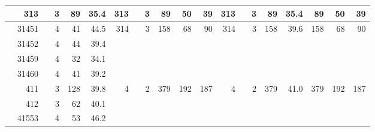 \begin{table}[ht!]
\begin{tabular}{rrrrrrrrrrrrrrrr}
313 & 3 & 89 & \multicolumn{1}{r|}{﻿35.4} & 313 & 3 & 89 & 50 & \multicolumn{1}{r|}{﻿39} & 313 & 3 & 89 & 35.4 & 89 & 50 & 39 \\
\bottomrule
\colorbox{medium-gray}{ 31451} & \colorbox{medium-gray}{\ \  4} & \colorbox{medium-gray}{ 41} & \multicolumn{1}{r|}{\colorbox{medium-gray}{ ﻿44.5}} & \colorbox{medium-gray}{ 314} & \colorbox{medium-gray}{\ \  3} & \colorbox{medium-gray}{ 158} & \colorbox{medium-gray}{ 68} & \multicolumn{1}{r|}{\colorbox{medium-gray}{ ﻿90}} & \colorbox{medium-gray}{ 314} & \colorbox{medium-gray}{\ \  3} & \colorbox{medium-gray}{ 158} & \colorbox{medium-gray}{ 39.6} & \colorbox{medium-gray}{ 158} & \colorbox{medium-gray}{ 68} & \colorbox{medium-gray}{ 90} \\ 
\colorbox{medium-gray}{ 31452} & \colorbox{medium-gray}{\ \  4} & \colorbox{medium-gray}{ 44} & \multicolumn{1}{r|}{\colorbox{medium-gray}{ ﻿39.4}} &  &  &  &  & \multicolumn{1}{r|}{﻿} &  &  &  &  &  &  &  \\ 
\colorbox{medium-gray}{ 31459} & \colorbox{medium-gray}{\ \  4} & \colorbox{medium-gray}{ 32} & \multicolumn{1}{r|}{\colorbox{medium-gray}{ ﻿34.1}} &  &  &  &  & \multicolumn{1}{r|}{﻿} &  &  &  &  &  &  &  \\ 
\colorbox{medium-gray}{ 31460} & \colorbox{medium-gray}{\ \  4} & \colorbox{medium-gray}{ 41} & \multicolumn{1}{r|}{\colorbox{medium-gray}{ ﻿39.2}} &  &  &  &  & \multicolumn{1}{r|}{﻿} &  &  &  &  &  &  &  \\
\bottomrule
\colorbox{light-gray}{\ \ \ \  411} & \colorbox{light-gray}{\ \  3} & \colorbox{light-gray}{128} & \multicolumn{1}{r|}{\colorbox{light-gray}{ ﻿39.8}} & \colorbox{light-gray}{\ \  4} & \colorbox{light-gray}{\ \  2} & \colorbox{light-gray}{ 379} & \colorbox{light-gray}{ 192} & \multicolumn{1}{r|}{\colorbox{light-gray}{ 187}} & \colorbox{light-gray}{\ \  4} & \colorbox{light-gray}{\ \  2} & \colorbox{light-gray}{ 379} & \colorbox{light-gray}{ 41.0} & \colorbox{light-gray}{ 379} & \colorbox{light-gray}{ 192} & \colorbox{light-gray}{ 187} \\ 
\colorbox{light-gray}{\ \ \ \  412} & \colorbox{light-gray}{\ \  3} & \colorbox{light-gray}{ 62} & \multicolumn{1}{r|}{\colorbox{light-gray}{ ﻿40.1}} &  &  &  &  & \multicolumn{1}{r|}{﻿} &  &  &  &  &  &  &  \\ 
\colorbox{light-gray}{ 41553} & \colorbox{light-gray}{\ \  4} & \colorbox{light-gray}{ 53} & \multicolumn{1}{r|}{\colorbox{light-gray}{ ﻿46.2}} &  &  &  &  & \multicolumn{1}{r|}{﻿} &  &  &  &  &  &  &  \\ 

\end{tabular}
\end{table}
